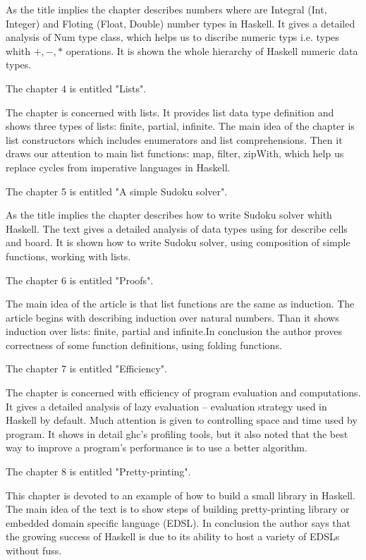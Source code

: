 \documentclass[a4paper, 14pt]{extarticle}
\begin{document}
As the title implies the chapter describes numbers where are Integral (Int, Integer) and
Floting (Float, Double) number types in Haskell. It gives a detailed analysis of Num 
type class, which helps us to discribe numeric typs i.e. types whith $+, -, *$ operations.
It is shown the whole hierarchy of Haskell numeric data types.

\vskip 1cm

The chapter 4 is entitled "Lists".

The chapter is concerned with lists. It provides list data type definition and shows three
types of lists: finite, partial, infinite. The main idea of the chapter is list constructors
which includes enumerators and list comprehensions. Then it draws our attention to main
list functions: map, filter, zipWith, which help us replace cycles from imperative
languages in Haskell.

\vskip 1cm

The chapter 5 is entitled "A simple Sudoku solver".

As the title implies the chapter describes how to write Sudoku solver whith Haskell.
The text gives a detailed analysis of data types using for describe cells and board.
It is shown how to write Sudoku solver, using composition of simple functions, 
working with lists.

\vskip 1cm

The chapter 6 is entitled "Proofs".

The main idea of the article is that list functions are the same as induction.
The article begins with describing induction over natural numbers. Than it shows
induction over lists: finite, partial and infinite.In conclusion the author proves
correctness of some function definitions, using folding functions.

\vskip 1cm

The chapter 7 is entitled "Efficiency".

The chapter is concerned with efficiency of program evaluation and computations.
It gives a detailed analysis of lazy evaluation -- evaluation strategy used in
Haskell by default. Much attention is given to controlling space and time used
by program. It shows in detail ghc's profiling tools, but it also noted that
the best way to improve a program’s performance is to use a better algorithm.

\vskip 1cm

The chapter 8 is entitled "Pretty-printing".

This chapter is devoted to an example of how to build a small library in Haskell.
The main idea of the text is to show steps of building pretty-printing library or
embedded domain specific language (EDSL). In conclusion the author says that the
growing success of Haskell is due to its ability to host a variety of EDSLs
without fuss.
\end{document}
